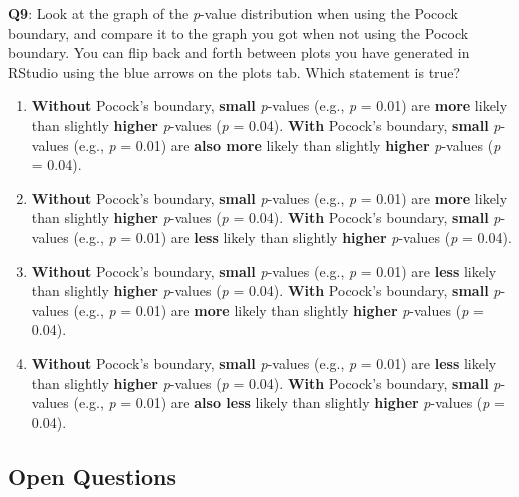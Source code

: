 \documentclass[
  oneside]{krantz}
\providecommand{\tightlist}{%
  \setlength{\itemsep}{0pt}\setlength{\parskip}{0pt}}
\begin{document}
\textbf{Q9}: Look at the graph of the \emph{p}-value distribution when using the Pocock boundary, and compare it to the graph you got when not using the Pocock boundary. You can flip back and forth between plots you have generated in RStudio using the blue arrows on the plots tab. Which statement is true?

\begin{enumerate}
\def\labelenumi{\Alph{enumi})}
\tightlist
\item
  \textbf{Without} Pocock's boundary, \textbf{small} \emph{p}-values (e.g., \emph{p} = 0.01) are
  \textbf{more} likely than slightly \textbf{higher} \emph{p}-values (\emph{p} = 0.04). \textbf{With}
  Pocock's boundary, \textbf{small} \emph{p}-values (e.g., \emph{p} = 0.01) are \textbf{also more}
  likely than slightly \textbf{higher} \emph{p}-values (\emph{p} = 0.04).
\item
  \textbf{Without} Pocock's boundary, \textbf{small} \emph{p}-values (e.g., \emph{p} = 0.01) are
  \textbf{more} likely than slightly \textbf{higher} \emph{p}-values (\emph{p} = 0.04). \textbf{With}
  Pocock's boundary, \textbf{small} \emph{p}-values (e.g., \emph{p} = 0.01) are \textbf{less} likely
  than slightly \textbf{higher} \emph{p}-values (\emph{p} = 0.04).
\item
  \textbf{Without} Pocock's boundary, \textbf{small} \emph{p}-values (e.g., \emph{p} = 0.01) are
  \textbf{less} likely than slightly \textbf{higher} \emph{p}-values (\emph{p} = 0.04). \textbf{With}
  Pocock's boundary, \textbf{small} \emph{p}-values (e.g., \emph{p} = 0.01) are \textbf{more} likely
  than slightly \textbf{higher} \emph{p}-values (\emph{p} = 0.04).
\item
  \textbf{Without} Pocock's boundary, \textbf{small} \emph{p}-values (e.g., \emph{p} = 0.01) are
  \textbf{less} likely than slightly \textbf{higher} \emph{p}-values (\emph{p} = 0.04). \textbf{With}
  Pocock's boundary, \textbf{small} \emph{p}-values (e.g., \emph{p} = 0.01) are \textbf{also less}
  likely than slightly \textbf{higher} \emph{p}-values (\emph{p} = 0.04).
\end{enumerate}

\hypertarget{open-questions-1}{%
\subsection{Open Questions}\label{open-questions-1}}
\end{document}
